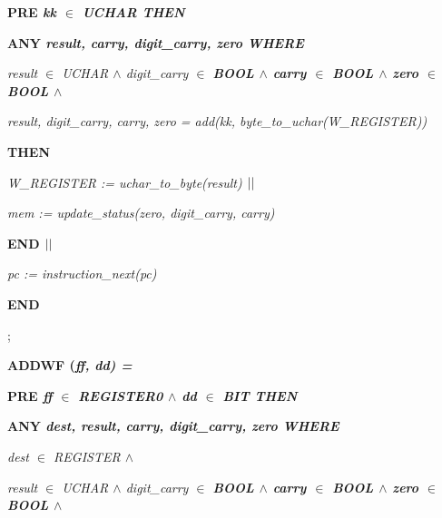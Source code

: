 \begin{sloppypar}
\hspace*{0.40in}\bf PRE \it kk  $\in$  \it UCHAR \bf THEN

\hspace*{0.60in}\bf ANY \it result\rm , \it carry\rm , \it digit\_carry\rm , \it zero \bf WHERE 

\hspace*{0.80in}\it result  $\in$  \it UCHAR  $\land$  \it digit\_carry  $\in$  \bf BOOL  $\land$  \it carry  $\in$  \bf BOOL  $\land$  \it zero  $\in$  \bf BOOL  $\land$ 

\hspace*{0.80in}\it result\rm , \it digit\_carry\rm , \it carry\rm , \it zero \rm = \it add\rm (\it kk\rm , \it byte\_to\_uchar\rm (\it W\_REGISTER\rm )\rm )

\hspace*{0.60in}\bf THEN

\hspace*{0.80in}\it W\_REGISTER \rm := \it uchar\_to\_byte\rm (\it result\rm )  $\mbox{$\mid\mid$}$ 

\hspace*{0.80in}\it mem \rm := \it update\_status\rm (\it zero\rm , \it digit\_carry\rm , \it carry\rm )

\hspace*{0.60in}\bf END  $\mbox{$\mid\mid$}$ 

\hspace*{0.60in}\it pc \rm := \it instruction\_next\rm (\it pc\rm )

\hspace*{0.40in}\bf END

\hspace*{0.20in}\rm ;

\hspace*{0.20in}\bf ADDWF \rm (\it ff\rm , \it dd\rm ) \rm =

\hspace*{0.40in}\bf PRE \it ff  $\in$  \it REGISTER0  $\land$  \it dd  $\in$  \it BIT \bf THEN

\hspace*{0.60in}\bf ANY \it dest\rm , \it result\rm , \it carry\rm , \it digit\_carry\rm , \it zero \bf WHERE 

\hspace*{0.80in}\it dest  $\in$  \it REGISTER  $\land$ 

\hspace*{0.80in}\it result  $\in$  \it UCHAR  $\land$  \it digit\_carry  $\in$  \bf BOOL  $\land$  \it carry  $\in$  \bf BOOL  $\land$  \it zero  $\in$  \bf BOOL  $\land$ 


\end{sloppypar}
